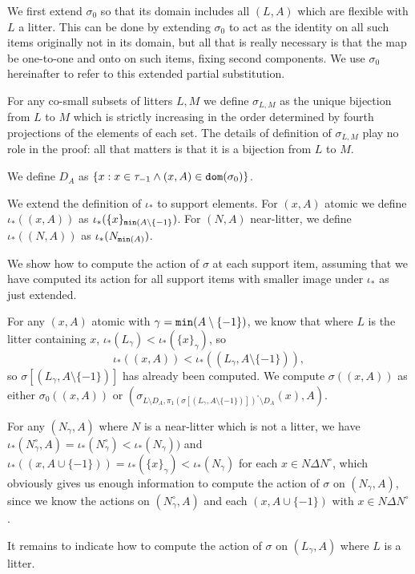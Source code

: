\documentclass[12pt]{article}
\begin{document}
\begin{enumerate}
We first extend $\sigma_0$ so that its domain includes all $(L,A)$ which are flexible with $L$ a litter.  This can be done by extending $\sigma_0$ to act as the identity on all such items originally not in its domain, but all that is really necessary is that the map be one-to-one and onto on such items, fixing second components.  We use $\sigma_0$ hereinafter to refer to this extended partial substitution.

For any co-small subsets of litters $L,M$ we define $\sigma_{L,M}$ as the unique bijection from $L$ to $M$ which is strictly increasing in the order determined by fourth projections of the elements of each set.  The details of definition of $\sigma_{L,M}$ play no role in the proof: all that matters is that it is a bijection from $L$ to $M$.

We define $D_A$ as $\{x:x \in \tau_{-1} \wedge (x,A) \in {\tt dom}(\sigma_0)\}$.

We extend the definition of $\iota_*$ to support elements.  For $(x,A)$ atomic we define $\iota_*((x,A))$ as $\iota_*(\{x\}_{{\tt min}(A\setminus \{-1\}})$.  For $(N,A)$ near-litter, we define $\iota_*((N,A))$ as $\iota_*(N_{{\tt min}(A)})$.

We show how to compute the action of $\sigma$ at each support item, assuming that we have computed its action for all support items with smaller image under $\iota_*$ as just extended.

For any $(x,A)$ atomic with $\gamma={\tt min}(A \setminus \{-1\})$, we know that where $L$ is the litter containing $x$, $\iota_*(L_\gamma)<\iota_*(\{x\}_\gamma)$, so $$\iota_*((x,A))<\iota_*((L_\gamma,A \setminus\{-1\})),$$ so $\sigma[(L_\gamma,A\setminus \{-1\})]$ has already been computed.  We compute $\sigma((x,A))$ as either $\sigma_0((x,A))$ or $(\sigma_{L\setminus D_A,\pi_1(\sigma[(L_\gamma,A\setminus \{-1\})])^\circ\setminus D_A}(x),A)$.

For any $(N_\gamma,A)$ where $N$ is a near-litter which is not a litter, we have $\iota_*(N^\circ_\gamma,A) = \iota_*(N^\circ_\gamma)<\iota_*(N_\gamma))$ and $\iota_*((x,A\cup \{-1\})) = \iota_*(\{x\}_\gamma)<\iota_*(N_\gamma)$ for each $x \in N \Delta N^\circ$, which obviously gives us enough information to compute the action of $\sigma$ on $(N_\gamma,A)$,
since we know the actions on $(N^\circ_\gamma,A)$ and each $(x,A\cup \{-1\})$ with $x \in N \Delta N^\circ$.

It remains to indicate how to compute the action of $\sigma$ on $(L_\gamma,A)$ where $L$ is a litter.


\end{enumerate}
\end{document}
